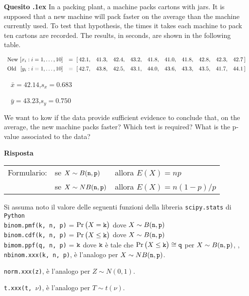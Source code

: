 \documentclass[11pt,twoside,a4paper]{article}
\newcounter{quesito}
\newenvironment{question}{\addtocounter{quesito}{1}\par\textbf{Quesito \thequesito.\kern1ex}}{\vspace{0.5\parskip}}
\newenvironment{answer}{\par\textbf{Risposta\quad}}{\vspace{\parskip}}
\begin{document}
\begin{question}
In a packing plant, a machine packs cartons with jars. It is supposed that a new machine will pack faster on the average than the machine currently used. To test that hypothesis, the times it takes each machine to pack ten cartons are recorded. The results, in seconds, are shown in the following table.

$\begin{array}{llllllllllll}
\textrm{New }[x_i:i=1,\dots,10] &=\  [\,42.1,&  41.3,&  42.4,&  43.2,&  41.8,&  41.0,&  41.8,&  42.8,&  42.3,&  42.7\,]
\\[1ex]
\textrm{Old }\hfill [y_i:i=1,\dots,10] &=\ [\,42.7,& 43.8,& 42.5,& 43.1,& 44.0,& 43.6,& 43.3,& 43.5,& 41.7,& 44.1\,]
\end{array}$\smallskip

$\quad\bar x = 42.14$,\quad$s_x= 0.683$

$\quad\bar y = 43.23$,\quad$s_y=  0.750$

We want to kow if the data provide sufficient evidence to conclude that, on the average, the new machine packs faster? 
Which test is required? What is the p-value associated to the data?
\begin{answer}

\end{answer}
\end{question}

\vfill\hrulefill\par
\begin{tabular}{@{}lll}
Formulario:& se $X\sim B({\tt n},{\tt p})$ & allora $E(X)=np$\\
           & se $X\sim NB({\tt n},{\tt p})$& allora $E(X)=n(1-p)/p$
\end{tabular}

Si assuma noto il valore delle seguenti funzioni della libreria {\tt scipy.stats\/} di  {\tt Python\/}\\
{\tt binom.pmf(k, n, p)} = $\Pr\big(X={\tt k}\big)$ dove $X\sim B({\tt n},{\tt p})$\\
{\tt binom.cdf(k, n, p)} = $\Pr\big(X\le{\tt k}\big)$ dove  $X\sim B({\tt n},{\tt p})$ \\
{\tt bimom.ppf(q, n, p)} = ${\tt k}$ dove ${\tt k}$ è tale che $\Pr\big(X\le{\tt k}\big)\cong{\tt q}$ per $X\sim B({\tt n},{\tt p})$, ,  {\tt nbinom.xxx(k, n, p)}, è l'analogo per $X\sim NB({\tt n},{\tt p})$.

{\tt norm.xxx(z)}, è l'analogo per $Z\sim N(0,1)$.

{\tt t.xxx(t, $\nu$)}, è l'analogo per $T\sim t(\nu)$.
\end{document}
